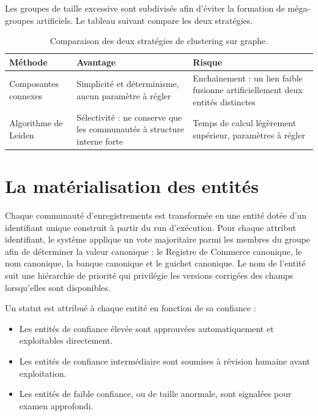 \noindent Les groupes de taille excessive sont subdivisés afin d'éviter la formation de méga-groupes artificiels. Le tableau suivant compare les deux stratégies.

\begin{table}[H]
\centering
\caption{Comparaison des deux stratégies de clustering sur graphe.}
\renewcommand{\arraystretch}{1.3}
\setlength{\tabcolsep}{3pt}
{\small
\begin{tabular}{|p{3.4cm}|p{5.1cm}|p{5.1cm}|}
\hline
\textbf{Méthode} & \textbf{Avantage} & \textbf{Risque} \\
\hline
Composantes connexes & Simplicité et déterminisme, aucun paramètre à régler & Enchaînement : un lien faible fusionne artificiellement deux entités distinctes \\
\hline
Algorithme de Leiden & Sélectivité : ne conserve que les communautés à structure interne forte & Temps de calcul légèrement supérieur, paramètres à régler \\
\hline
\end{tabular}
}
\end{table}

\section{La matérialisation des entités}

Chaque communauté d'enregistrements est transformée en une entité dotée d'un identifiant unique construit à partir du run d'exécution. Pour chaque attribut identifiant, le système applique un vote majoritaire parmi les membres du groupe afin de déterminer la valeur canonique : le Registre de Commerce canonique, le nom canonique, la banque canonique et le guichet canonique. Le nom de l'entité suit une hiérarchie de priorité qui privilégie les versions corrigées des champs lorsqu'elles sont disponibles.

Un statut est attribué à chaque entité en fonction de sa confiance :

\begin{itemize}
    \item Les entités de confiance élevée sont approuvées automatiquement et exploitables directement.
    \item Les entités de confiance intermédiaire sont soumises à révision humaine avant exploitation.
    \item Les entités de faible confiance, ou de taille anormale, sont signalées pour examen approfondi.
\end{itemize}

